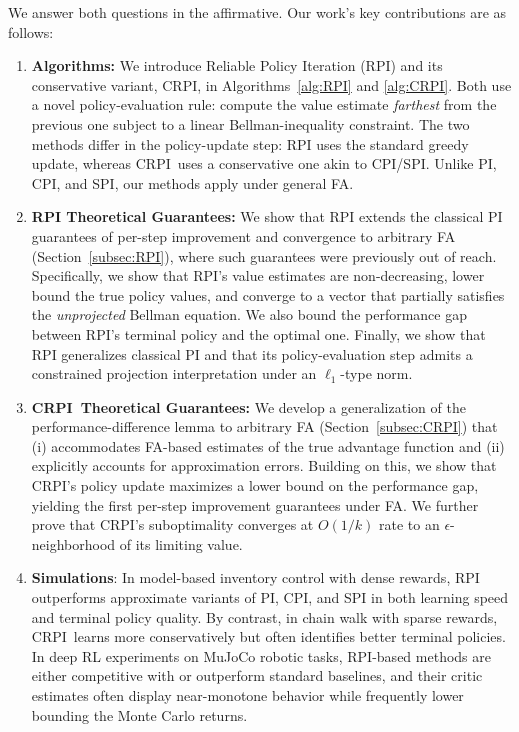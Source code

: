 \documentclass[twoside]{article}
\theoremstyle{plain}
\theoremstyle{definition}
\theoremstyle{remark}
\newcommand{\CRPI}{CRPI}
\begin{document}
We answer both questions in the affirmative. Our work's key contributions are as follows:
%
\begin{enumerate}[leftmargin=*]

    \item \textbf{Algorithms:} We introduce Reliable Policy Iteration (RPI) and its conservative variant, \CRPI, in Algorithms~\ref{alg:RPI} and \ref{alg:CRPI}. Both use a novel policy-evaluation rule: compute the value estimate \emph{farthest} from the previous one subject to a linear Bellman-inequality constraint. The two methods differ in the policy-update step: RPI uses the standard greedy update, whereas \CRPI\ uses a conservative one akin to CPI/SPI. Unlike PI, CPI, and SPI, our methods apply under general FA.
    
    \item \textbf{RPI Theoretical Guarantees:} We show that RPI extends the classical PI guarantees of per-step improvement and convergence to arbitrary FA (Section~\ref{subsec:RPI}), where such guarantees were previously out of reach. Specifically, we show that RPI's value estimates are non-decreasing, lower bound the true policy values, and converge to a vector that partially satisfies the \textit{unprojected} Bellman equation. We also bound the performance gap between RPI’s terminal policy and the optimal one. Finally, we show that RPI generalizes classical PI and that its policy-evaluation step admits a constrained projection interpretation under an $\ell_1$-type norm.

    \item \textbf{\CRPI\ Theoretical Guarantees:} We develop a generalization of the performance-difference lemma to arbitrary FA (Section~\ref{subsec:CRPI}) that (i) accommodates FA-based estimates of the true advantage function and (ii) explicitly accounts for approximation errors. Building on this, we show that \CRPI’s policy update maximizes a lower bound on the performance gap, yielding the first per-step improvement guarantees under FA. We further prove that \CRPI’s suboptimality converges at $O(1/k)$ rate to an $\epsilon$-neighborhood of its limiting value.
    
    \item \textbf{Simulations}: In model-based inventory control with dense rewards, RPI outperforms approximate variants of PI, CPI, and SPI in both learning speed and terminal policy quality. By contrast, in chain walk with sparse rewards, \CRPI\ learns more conservatively but often identifies better terminal policies. In deep RL experiments on MuJoCo robotic tasks, RPI-based methods are either competitive with or outperform standard baselines, and their critic estimates often display near-monotone behavior while frequently lower bounding the Monte Carlo returns.
\end{enumerate}
\end{document}
